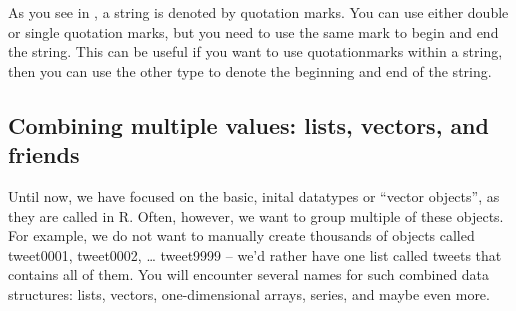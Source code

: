 As you see in , a string is denoted by quotation
marks. You can use either double or single quotation marks, but you
need to use the same mark to begin and end the string. This can be
useful if you want to use quotationmarks within a string, then you can
use the other type to denote the beginning and end of the string.



\subsection{Combining multiple values: lists, vectors, and friends}

Until now, we have focused on the basic, inital datatypes or ``vector
objects'', as they are called in R.  Often, however, we want to group
multiple of these objects. For example, we do not want to manually
create thousands of objects called tweet0001, tweet0002, \ldots
tweet9999 -- we'd rather have one list called tweets that contains all
of them. You will encounter several names for such combined data
structures: lists, vectors, one-dimensional arrays, series, and maybe
even more. 



